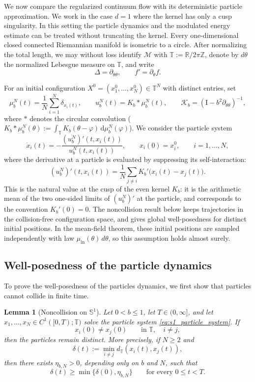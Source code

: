 \documentclass[11pt]{article}
\newtheorem{lemma}[theorem]{Lemma}
\theoremstyle{definition}
\newcommand{\Sphere}{\mathbb{S}}
\newcommand{\Torus}{\mathbb{T}}
\newcommand{\R}{\mathbb{R}}
\def\Kb{\mathcal K_b}
\def\M{\mathcal M}
\def\I{\mathrm{I}}
\begin{document}
We now compare the regularized continuum flow with its deterministic particle
approximation. We work in the case  $d=1$ where the kernel has only a cusp
singularity. In this setting the particle dynamics and the
modulated energy estimate can be treated without truncating the kernel.   Every one-dimensional closed connected Riemannian manifold is isometric to a circle. After normalizing the total length, we may without loss identify $\M$ with
$\Torus:=\R/2\pi\mathbb Z$, denote by $d\theta$ the normalized Lebesgue
measure on $\Torus$, and write
\[
\Delta=\partial_{\theta\theta},
\qquad
f'=\partial_\theta f.
\]

For an initial configuration $X^0=(x_1^0,\dots,x_N^0)\in\Torus^N$ with
distinct entries, set
\[
\mu^N_b(t)=\frac1N\sum_{i=1}^N\delta_{x_i(t)},
\qquad
u^N_b(t)=K_b*\mu^N_b(t),
\qquad
\Kb=(\I-b^2\partial_{\theta\theta})^{-1},
\]
where $*$ denotes the circular convolution ($K_b*\mu^N_b(\theta):=\int_{\Torus}K_b(\theta-\varphi)\,\mathrm d\mu_b^N(\varphi)$).
We consider the particle system
\begin{equation}\label{eq:s1_particle_system}
\dot x_i(t)=-\frac{(u^N_b)'(t,x_i(t))}{u^N_b(t,x_i(t))},
\qquad
x_i(0)=x_i^0,
\qquad
i=1,\dots,N,
\end{equation}
where the derivative at a particle is evaluated by suppressing its
self-interaction:
\[
(u^N_b)'(t,x_i(t))
=
\frac1N\sum_{j\ne i}K_b'\bigl(x_i(t)-x_j(t)\bigr).
\]
This is the natural value at the cusp of the even kernel $K_b$: 
it is the arithmetic mean of the two one-sided limits of $(u^N_b)'$ at the
particle, and corresponds to the convention $K_b'(0)=0$. The noncollision result  below keeps trajectories in the collision-free configuration space, and
 gives global well-posedness for distinct
initial positions. In the mean-field theorem, these initial positions are
sampled independently with law $\mu_{\mathrm{in}}(\theta)\,d\theta$, so this assumption holds almost surely.


\subsection{Well-posedness of the particle dynamics}

To prove the well-posedness of the particles dynamics, we first show that particles cannot collide in finite time.

\begin{lemma}[Noncollision on $\Sphere^1$]\label{lem:s1_noncollision}
Let $0<b\le1$, let $T\in(0,\infty]$, and let
$x_1,\dots,x_N\in C^1([0,T);\Torus)$ solve the particle system
\eqref{eq:s1_particle_system}. If
\[
x_i(0)\ne x_j(0)\qquad\text{in }\Torus,\quad i\ne j,
\]
then the particles remain distinct. More precisely, if $N\ge2$ and
\[
\delta(t):=\min_{i\ne j}d_{\Torus}(x_i(t),x_j(t)),
\]
then there exists $\eta_{b,N}>0$, depending only on $b$ and $N$, such that
\[
\delta(t)\ge \min\{\delta(0),\eta_{b,N}\}
\qquad\text{for every }0\le t<T.
\]
\end{lemma}
\end{document}
